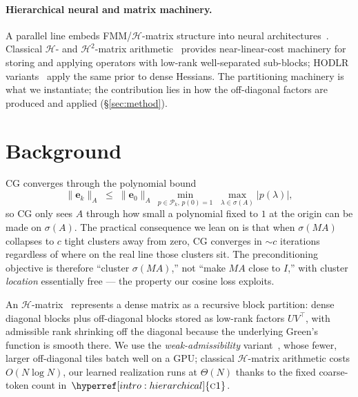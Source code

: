 \documentclass[acmtog]{acmart}
\theoremstyle{plain}
\begin{document}
\paragraph{Hierarchical neural and matrix machinery.}
A parallel line embeds FMM/$\mathcal{H}$-matrix structure into neural
architectures~\cite{Fan2019multiscale,li2020multipole,Fognini2025neural,Sittoni2026neural,Xu2025neural,Lyu2026multigrid,Luz2020learning}.
Classical $\mathcal{H}$- and $\mathcal{H}^2$-matrix
arithmetic~\cite{hackbusch1999sparse,hackbusch2002adaptive,borm2003introduction} provides
near-linear-cost machinery for storing and applying operators with low-rank
well-separated sub-blocks; HODLR variants~\cite{Hartland2023hodlr} apply the same prior
to dense Hessians. The partitioning machinery is what we instantiate; the contribution
lies in how the off-diagonal factors are produced and applied (\S\ref{sec:method}).

\section{Background}
\label{sec:background}

CG converges through the polynomial bound
\begin{equation}
  \|\mathbf{e}_k\|_A
  \;\le\; \|\mathbf{e}_0\|_A\,\min_{p\in\mathcal{P}_k,\,p(0)=1}\;
          \max_{\lambda\in\sigma(A)}|p(\lambda)|,
  \label{eq:cg-poly}
\end{equation}
so CG only sees $A$ through how small a polynomial fixed to $1$ at the origin can be made on
$\sigma(A)$. The practical consequence we lean on is that when $\sigma(MA)$ collapses to $c$
tight clusters away from zero, CG converges in $\sim\!c$ iterations regardless of where on
the real line those clusters sit. The preconditioning objective is therefore ``cluster
$\sigma(MA)$,'' not ``make $MA$ close to $I$,'' with cluster \emph{location} essentially
free --- the property our cosine loss exploits.

An $\mathcal{H}$-matrix~\cite{hackbusch1999sparse,hackbusch2002adaptive,borm2003introduction}
represents a dense matrix as a recursive block partition: dense diagonal blocks plus
off-diagonal blocks stored as low-rank factors $UV^\top$, with admissible rank shrinking
off the diagonal because the underlying Green's function is smooth there. We use the
\emph{weak-admissibility} variant~\cite{hackbusch2002adaptive,Hartland2023hodlr}, whose
fewer, larger off-diagonal tiles batch well on a GPU; classical $\mathcal{H}$-matrix
arithmetic costs $O(N\log N)$, our learned realization runs at $\Theta(N)$ thanks to the
fixed coarse-token count in~$\hyperref[intro:hierarchical]{\textsc{c1}}$.
\end{document}

